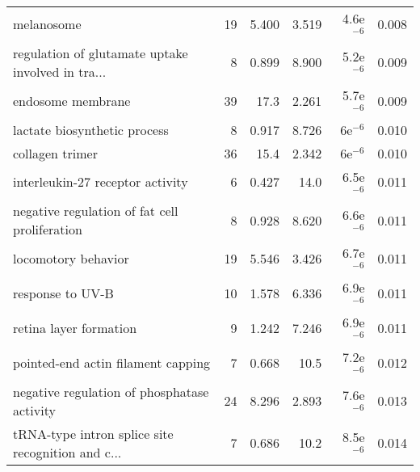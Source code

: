 \begin{longtable}{lrrrrr}
                                        melanosome &                      19 &                   5.400 &      3.519 &          4.6e$^{-6}$ &                0.008 \\
 regulation of glutamate uptake involved in tra... &                       8 &                   0.899 &      8.900 &          5.2e$^{-6}$ &                0.009 \\
                                 endosome membrane &                      39 &                    17.3 &      2.261 &          5.7e$^{-6}$ &                0.009 \\
                      lactate biosynthetic process &                       8 &                   0.917 &      8.726 &            6e$^{-6}$ &                0.010 \\
                                   collagen trimer &                      36 &                    15.4 &      2.342 &            6e$^{-6}$ &                0.010 \\
                  interleukin-27 receptor activity &                       6 &                   0.427 &       14.0 &          6.5e$^{-6}$ &                0.011 \\
     negative regulation of fat cell proliferation &                       8 &                   0.928 &      8.620 &          6.6e$^{-6}$ &                0.011 \\
                               locomotory behavior &                      19 &                   5.546 &      3.426 &          6.7e$^{-6}$ &                0.011 \\
                                  response to UV-B &                      10 &                   1.578 &      6.336 &          6.9e$^{-6}$ &                0.011 \\
                            retina layer formation &                       9 &                   1.242 &      7.246 &          6.9e$^{-6}$ &                0.011 \\
                pointed-end actin filament capping &                       7 &                   0.668 &       10.5 &          7.2e$^{-6}$ &                0.012 \\
       negative regulation of phosphatase activity &                      24 &                   8.296 &      2.893 &          7.6e$^{-6}$ &                0.013 \\
 tRNA-type intron splice site recognition and c... &                       7 &                   0.686 &       10.2 &          8.5e$^{-6}$ &                0.014 \\

\end{longtable}
